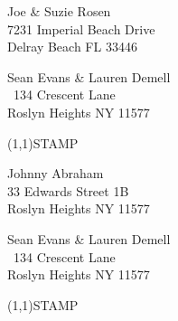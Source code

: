 \documentclass[12pt]{article}
\begin{document}
\begin{center} \begin{Huge} \vspace*{\fill}
Joe \& Suzie Rosen\\
7231 Imperial Beach Drive\\
Delray Beach FL  33446\\
\vspace{\fill} \end{Huge} \end{center}

\clearpage

\begin{minipage}{.5\linewidth} \noindent
Sean Evans \& Lauren Demell\\\ 
134 Crescent Lane\\ 
Roslyn Heights NY 11577
\end{minipage}
\begin{minipage}{.5\linewidth \hspace{-.2in} \vspace{-.3in}}
\begin{flushright}
\framebox(1,1){STAMP}
\end{flushright}
\end{minipage}

\begin{center} \begin{Huge} \vspace*{\fill}
Johnny Abraham\\
33 Edwards Street 1B\\
Roslyn Heights NY 11577\\
\vspace{\fill} \end{Huge} \end{center}

\clearpage

\begin{minipage}{.5\linewidth} \noindent
Sean Evans \& Lauren Demell\\\ 
134 Crescent Lane\\ 
Roslyn Heights NY 11577
\end{minipage}
\begin{minipage}{.5\linewidth \hspace{-.2in} \vspace{-.3in}}
\begin{flushright}
\framebox(1,1){STAMP}
\end{flushright}
\end{minipage}
\end{document}
